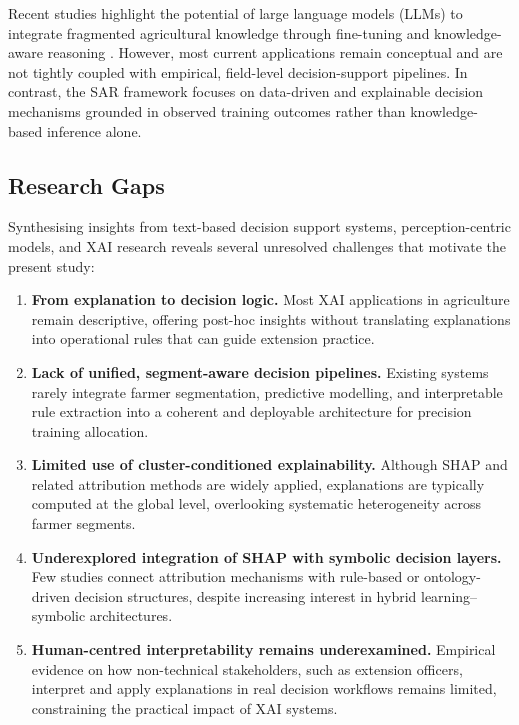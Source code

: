\documentclass[3p,twocolumn,authoryear]{elsarticle}
\begin{document}
Recent studies highlight the potential of large language models (LLMs) to
integrate fragmented agricultural knowledge through fine-tuning and
knowledge-aware reasoning \citep{li2025llm}.
However, most current applications remain conceptual and are not tightly
coupled with empirical, field-level decision-support pipelines.
In contrast, the SAR framework focuses on data-driven and explainable
decision mechanisms grounded in observed training outcomes rather than
knowledge-based inference alone.

\subsection{Research Gaps}

Synthesising insights from text-based decision support systems,
perception-centric models, and XAI research reveals several unresolved
challenges that motivate the present study:

\begin{enumerate}
  \item \textbf{From explanation to decision logic.}
  Most XAI applications in agriculture remain descriptive, offering
  post-hoc insights without translating explanations into operational
  rules that can guide extension practice.

  \item \textbf{Lack of unified, segment-aware decision pipelines.}
  Existing systems rarely integrate farmer segmentation, predictive
  modelling, and interpretable rule extraction into a coherent and
  deployable architecture for precision training allocation.

  \item \textbf{Limited use of cluster-conditioned explainability.}
  Although SHAP and related attribution methods are widely applied,
  explanations are typically computed at the global level, overlooking
  systematic heterogeneity across farmer segments.

  \item \textbf{Underexplored integration of SHAP with symbolic decision
  layers.}
  Few studies connect attribution mechanisms with rule-based or
  ontology-driven decision structures, despite increasing interest in
  hybrid learning–symbolic architectures.

  \item \textbf{Human-centred interpretability remains underexamined.}
  Empirical evidence on how non-technical stakeholders, such as extension
  officers, interpret and apply explanations in real decision workflows
  remains limited, constraining the practical impact of XAI systems.
\end{enumerate}
\end{document}

